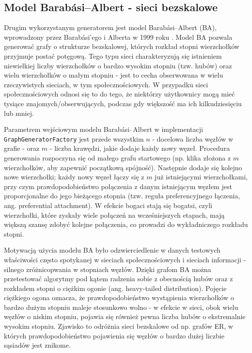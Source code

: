 \subsection{Model Barabási--Albert - sieci bezskalowe}
Drugim wykorzystanym generatorem jest model Barabási--Albert (BA), wprowadzony przez Barabási’ego i Alberta w 1999 roku \cite{barabasi1999emergence}. Model BA pozwala generować grafy o strukturze bezskalowej, których rozkład stopni wierzchołków przyjmuje postać potęgową. Tego typu sieci charakteryzują się istnieniem niewielkiej liczby wierzchołków o bardzo wysokim stopniu (tzw. hubów) oraz wielu wierzchołków o małym stopniu - jest to cecha obserwowana w wielu rzeczywistych sieciach, w tym społecznościowych. W przypadku sieci społecznościowych odnosi się to do tego, że niektórzy użytkownicy mogą mieć tysiące znajomych/obserwujących, podczas gdy większość ma ich kilkudziesięciu lub mniej.

Parametrem wejściowym modelu Barabási--Albert w implementacji \texttt{GraphGeneratorFactory} jest przede wszystkim $n$ - docelowa liczba węzłów w grafie - oraz $m$ - liczba krawędzi, jakie dodaje każdy nowy węzeł. Procedura generowania rozpoczyna się od małego grafu startowego (np. klika złożona z $m$ wierzchołków, aby zapewnić początkową spójność). Następnie dodaje się kolejno nowe wierzchołki; każdy nowy węzeł łączy się z $m$ już istniejącymi wierzchołkami, przy czym prawdopodobieństwo połączenia z danym istniejącym węzłem jest proporcjonalne do jego bieżącego stopnia (tzw. reguła preferencyjnego łączenia, ang. preferential attachment). W efekcie bogaci stają się bogatsi, czyli wierzchołki, które zyskały wiele połączeń na wcześniejszych etapach, mają większą szansę zdobyć kolejne połączenia, co prowadzi do wykładniczego rozkładu stopni.

Motywacją użycia modelu BA było odzwierciedlenie w danych testowych właściwości często spotykanej w sieciach społecznościowych i sieciach informacji - silnego zróżnicopwania w stopniach węzłów. Dzięki grafom BA można przetestować algorytmy pod kątem radzenia sobie z obecnością hubów oraz z rozkładem stopni o ciężkim ogonie (ang. heavy-tailed distribution). Pojęcie ciężkiego ogona oznacza, że prawdopodobieństwo wystąpienia wierzchołków o bardzo dużym stopniu maleje stosunkowo wolno - w efekcie w sieci, obok wielu węzłów o niskim stopniu, pojawia się również pewna liczba hubów o ekstremalnie wysokim stopniu. Zjawisko to odróżnia sieci bezskalowe od np. grafów ER, w których prawdopodobieństwo pojawienia się węzłów o bardzo dużej liczbie sąsiadów jest znikome.

